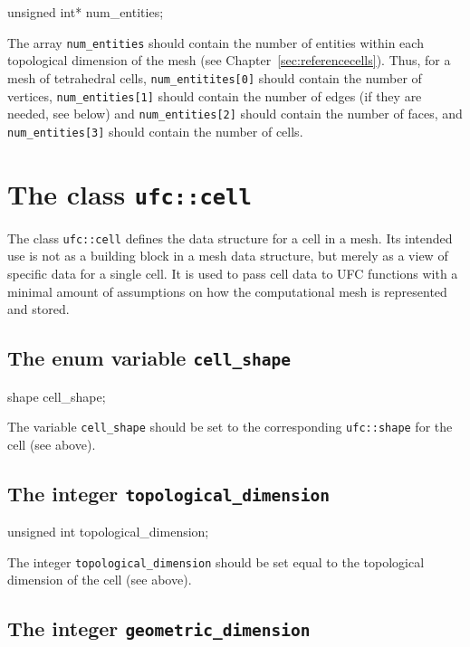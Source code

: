 \begin{code}
unsigned int* num_entities;
\end{code}

The array \texttt{num\_entities} should contain the number of entities
within each topological dimension of the mesh (see
Chapter~\ref{sec:referencecells}). Thus, for a mesh of tetrahedral
cells, \texttt{num\_entitites[0]} should contain the number of
vertices, \texttt{num\_entities[1]} should contain the number of edges
(if they are needed, see below) and \texttt{num\_entities[2]} should
contain the number of faces, and \texttt{num\_entities[3]} should
contain the number of cells.

\section{The class \texttt{ufc::cell}}

The class \texttt{ufc::cell} defines the data structure for a cell in
a mesh. Its intended use is not as a building block in a mesh data
structure, but merely as a view of specific data for a single cell.
It is used to pass cell data to UFC functions with a minimal amount of
assumptions on how the computational mesh is represented and stored.

\subsection{The enum variable \texttt{cell\_shape}}

\begin{code}
shape cell_shape;
\end{code}

The variable \texttt{cell\_shape} should be set to the corresponding
\texttt{ufc::shape} for the cell (see above).

\subsection{The integer \texttt{topological\_dimension}}

\begin{code}
unsigned int topological_dimension;
\end{code}

The integer \texttt{topological\_dimension} should be set equal to the
topological dimension of the cell (see above).

\subsection{The integer \texttt{geometric\_dimension}}

